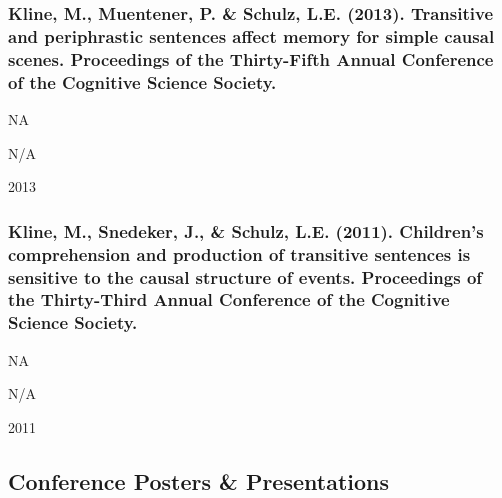 \documentclass[
]{article}
\begin{document}
\hypertarget{kline-m.-muentener-p.-schulz-l.e.-2013.-transitive-and-periphrastic-sentences-affect-memory-for-simple-causal-scenes.-proceedings-of-the-thirty-fifth-annual-conference-of-the-cognitive-science-society.}{%
\subsubsection{Kline, M., Muentener, P. \& Schulz, L.E. (2013).
Transitive and periphrastic sentences affect memory for simple causal
scenes. Proceedings of the Thirty-Fifth Annual Conference of the
Cognitive Science
Society.}\label{kline-m.-muentener-p.-schulz-l.e.-2013.-transitive-and-periphrastic-sentences-affect-memory-for-simple-causal-scenes.-proceedings-of-the-thirty-fifth-annual-conference-of-the-cognitive-science-society.}}

NA

N/A

2013

\hypertarget{kline-m.-snedeker-j.-schulz-l.e.-2011.-childrens-comprehension-and-production-of-transitive-sentences-is-sensitive-to-the-causal-structure-of-events.-proceedings-of-the-thirty-third-annual-conference-of-the-cognitive-science-society.}{%
\subsubsection{Kline, M., Snedeker, J., \& Schulz, L.E. (2011).
Children's comprehension and production of transitive sentences is
sensitive to the causal structure of events. Proceedings of the
Thirty-Third Annual Conference of the Cognitive Science
Society.}\label{kline-m.-snedeker-j.-schulz-l.e.-2011.-childrens-comprehension-and-production-of-transitive-sentences-is-sensitive-to-the-causal-structure-of-events.-proceedings-of-the-thirty-third-annual-conference-of-the-cognitive-science-society.}}

NA

N/A

2011

\hypertarget{conference-posters-presentations}{%
\subsection{Conference Posters \&
Presentations}\label{conference-posters-presentations}}
\end{document}
